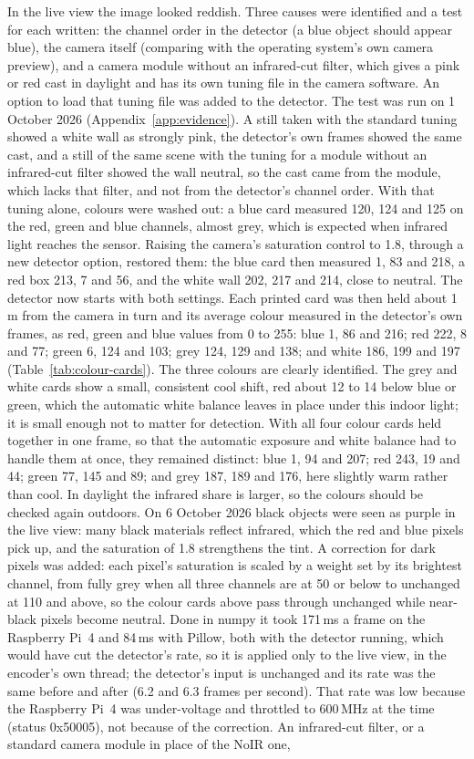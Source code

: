 In the live view the image looked reddish. Three causes were identified and a test for each written: the channel order in the detector (a blue object should appear blue), the camera itself (comparing with the operating system's own camera preview), and a camera module without an infrared-cut filter, which gives a pink or red cast in daylight and has its own tuning file in the camera software. An option to load that tuning file was added to the detector. The test was run on 1 October 2026 (Appendix~\ref{app:evidence}). A still taken with the standard tuning showed a white wall as strongly pink, the detector's own frames showed the same cast, and a still of the same scene with the tuning for a module without an infrared-cut filter showed the wall neutral, so the cast came from the module, which lacks that filter, and not from the detector's channel order. With that tuning alone, colours were washed out: a blue card measured 120, 124 and 125 on the red, green and blue channels, almost grey, which is expected when infrared light reaches the sensor. Raising the camera's saturation control to 1.8, through a new detector option, restored them: the blue card then measured 1, 83 and 218, a red box 213, 7 and 56, and the white wall 202, 217 and 214, close to neutral. The detector now starts with both settings. Each printed card was then held about 1\,m from the camera in turn and its average colour measured in the detector's own frames, as red, green and blue values from 0 to 255: blue 1, 86 and 216; red 222, 8 and 77; green 6, 124 and 103; grey 124, 129 and 138; and white 186, 199 and 197 (Table~\ref{tab:colour-cards}). The three colours are clearly identified. The grey and white cards show a small, consistent cool shift, red about 12 to 14 below blue or green, which the automatic white balance leaves in place under this indoor light; it is small enough not to matter for detection. With all four colour cards held together in one frame, so that the automatic exposure and white balance had to handle them at once, they remained distinct: blue 1, 94 and 207; red 243, 19 and 44; green 77, 145 and 89; and grey 187, 189 and 176, here slightly warm rather than cool. In daylight the infrared share is larger, so the colours should be checked again outdoors. On 6 October 2026 black objects were seen as purple in the live view: many black materials reflect infrared, which the red and blue pixels pick up, and the saturation of 1.8 strengthens the tint. A correction for dark pixels was added: each pixel's saturation is scaled by a weight set by its brightest channel, from fully grey when all three channels are at 50 or below to unchanged at 110 and above, so the colour cards above pass through unchanged while near-black pixels become neutral. Done in numpy it took 171\,ms a frame on the Raspberry Pi~4 and 84\,ms with Pillow, both with the detector running, which would have cut the detector's rate, so it is applied only to the live view, in the encoder's own thread; the detector's input is unchanged and its rate was the same before and after (6.2 and 6.3 frames per second). That rate was low because the Raspberry Pi~4 was under-voltage and throttled to 600\,MHz at the time (status 0x50005), not because of the correction. An infrared-cut filter, or a standard camera module in place of the NoIR one, 
